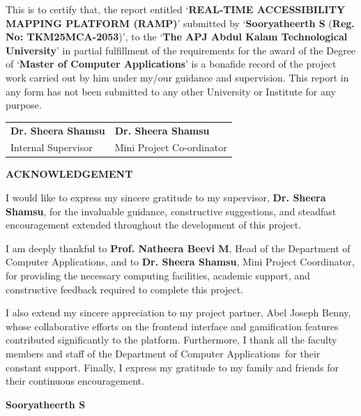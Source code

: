 \documentclass[12pt,a4paper]{report}
\newcommand{\projectTitle}{REAL-TIME ACCESSIBILITY MAPPING PLATFORM (RAMP)}
\newcommand{\studentName}{Sooryatheerth S}
\newcommand{\regNo}{TKM25MCA-2053}
\newcommand{\degreeName}{Master of Computer Applications}
\newcommand{\universityName}{The APJ Abdul Kalam Technological University}
\newcommand{\deptName}{Department of Computer Applications}
\newcommand{\supervisorName}{Dr. Sheera Shamsu}
\newcommand{\hodName}{Prof. Natheera Beevi M}
\newcommand{\coordinatorName}{Dr. Sheera Shamsu}
\begin{document}
\noindent This is to certify that, the report entitled `\textbf{\projectTitle}' submitted by `\textbf{\studentName} (\textbf{Reg. No: \regNo})', to the `\textbf{\universityName}' in partial fulfillment of the requirements for the award of the Degree of `\textbf{\degreeName}' is a bonafide record of the project work carried out by him under my/our guidance and supervision. This report in any form has not been submitted to any other University or Institute for any purpose.

\vspace{3.5cm}
\noindent
\begin{tabular}{p{7.5cm}p{7.5cm}}
\textbf{\supervisorName} & \textbf{\coordinatorName} \\
Internal Supervisor & Mini Project Co-ordinator
\end{tabular}

\newpage
\begin{center}
    {\Large \textbf{ACKNOWLEDGEMENT}\par}
\end{center}
\vspace{1cm}

\noindent I would like to express my sincere gratitude to my supervisor, \textbf{\supervisorName}, for the invaluable guidance, constructive suggestions, and steadfast encouragement extended throughout the development of this project.

\vspace{0.5cm}
\noindent I am deeply thankful to \textbf{\hodName}, Head of the \deptName, and to \textbf{\coordinatorName}, Mini Project Coordinator, for providing the necessary computing facilities, academic support, and constructive feedback required to complete this project.

\vspace{0.5cm}
\noindent I also extend my sincere appreciation to my project partner, Abel Joseph Benny, whose collaborative efforts on the frontend interface and gamification features contributed significantly to the platform. Furthermore, I thank all the faculty members and staff of the \deptName\ for their constant support. Finally, I express my gratitude to my family and friends for their continuous encouragement.

\vspace{2.5cm}
\begin{flushright}
\textbf{\studentName}
\end{flushright}
\end{document}
